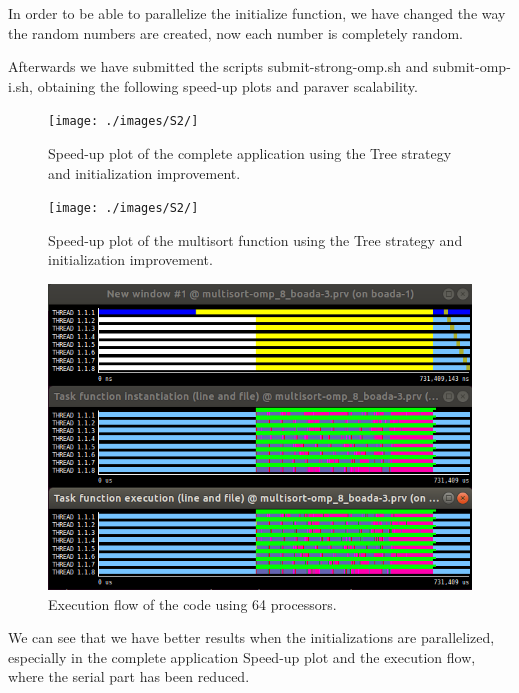 \documentclass[12pt, a4paper]{article}
\begin{document}
In order to be able to parallelize the initialize function, we have changed the way the random numbers are created, now each number is completely random.

Afterwards we have submitted the scripts submit-strong-omp.sh and submit-omp-i.sh, obtaining the following speed-up plots and paraver scalability.

\begin{figure}[H]
\centering
\begin{minipage}[b]{0.4\linewidth}
  \centering
  \texttt{[image: ./images/S2/]}
  \caption{Speed-up plot of the complete application using the Tree strategy and initialization improvement.}
  \label{fig:mandel-omp-10000-strong-21-time}
\end{minipage}%
\hspace{0.5cm}
\begin{minipage}[b]{0.4\linewidth}
  \centering
  \texttt{[image: ./images/S2/]}
  \caption{Speed-up plot of the multisort function using the Tree strategy and initialization improvement.}
  \label{fig:mandel-omp-10000-strong-21-speedup}
\end{minipage}
\end{figure}

\begin{figure}[H]
	\centering
	\includegraphics[scale=0.75]{./images/S2/OP2_paraver}
	
	\label{fig_ann:S2_scalability_op2}
	\caption{Execution flow of the code using 64 processors.}
\end{figure}

We can see that we have better results when the initializations are parallelized, especially in the complete application Speed-up plot and the execution flow, where the serial part has been reduced.
\end{document}
